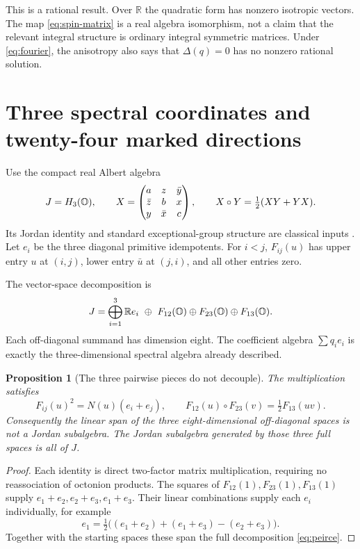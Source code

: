 \documentclass[11pt]{article}
\newtheorem{proposition}[theorem]{Proposition}
\theoremstyle{definition}\newtheorem{definition}[theorem]{Definition}
\newcommand{\R}{\mathbb R}\newcommand{\Q}{\mathbb Q}\newcommand{\Z}{\mathbb Z}
\begin{document}
This is a rational result. Over $\R$ the quadratic form has nonzero isotropic vectors. The map \eqref{eq:spin-matrix} is a real algebra isomorphism, not a claim that the relevant integral structure is ordinary integral symmetric matrices. Under \eqref{eq:fourier}, the anisotropy also says that $\Delta(q)=0$ has no nonzero rational solution.

\section{Three spectral coordinates and twenty-four marked directions}
Use the compact real Albert algebra
\begin{equation}\label{eq:albert}
 J=H_3(\mathbb O),\qquad
 X=\begin{pmatrix}
 a&z&\bar y\\\bar z&b&x\\y&\bar x&c
 \end{pmatrix},\qquad X\circ Y=\tfrac12(XY+YX).
\end{equation}
Its Jordan identity and standard exceptional-group structure are classical inputs \cite[\S\S3.4,4.2]{baez}\cite[\S2.1]{yokota}. Let $e_i$ be the three diagonal primitive idempotents. For $i<j$, $F_{ij}(u)$ has upper entry $u$ at $(i,j)$, lower entry $\bar u$ at $(j,i)$, and all other entries zero.

The vector-space decomposition is
\begin{equation}\label{eq:peirce}
 J=\bigoplus_{i=1}^3\R e_i\ \oplus\ F_{12}(\OO)\oplus F_{23}(\OO)\oplus F_{13}(\OO).
\end{equation}
Each off-diagonal summand has dimension eight. The coefficient algebra $\sum q_i e_i$ is exactly the three-dimensional spectral algebra already described.

\begin{proposition}[The three pairwise pieces do not decouple]\label{prop:peirce}
The multiplication satisfies
\[
 F_{ij}(u)^2=N(u)(e_i+e_j),\qquad
 F_{12}(u)\circ F_{23}(v)=\tfrac12F_{13}(uv).
\]
Consequently the linear span of the three eight-dimensional off-diagonal spaces is not a Jordan subalgebra. The Jordan subalgebra generated by those three full spaces is all of $J$.
\end{proposition}
\begin{proof}
Each identity is direct two-factor matrix multiplication, requiring no reassociation of octonion products. The squares of $F_{12}(1),F_{23}(1),F_{13}(1)$ supply $e_1+e_2,e_2+e_3,e_1+e_3$. Their linear combinations supply each $e_i$ individually, for example
\[
 e_1=\tfrac12\big((e_1+e_2)+(e_1+e_3)-(e_2+e_3)\big).
\]
Together with the starting spaces these span the full decomposition \eqref{eq:peirce}.
\end{proof}
\end{document}
